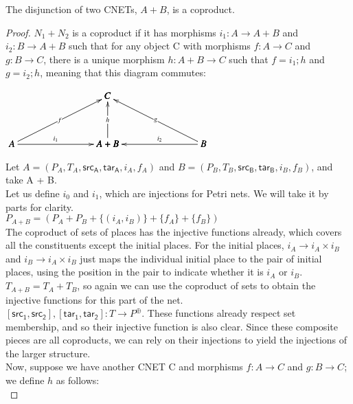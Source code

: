 \begin{lemma}
  \label{lemma:OR-coproduct}
  The disjunction of two CNETs, $A + B$, is a coproduct. 
\end{lemma}
\begin {proof}
$N_1 + N_2$ is a coproduct if it has morphisms $i_1: A \to A + B$ and $i_2: B \to A + B$ such that for any object C with morphisms $f: A\to C$ and $g: B\to C$, there is a unique morphism $h: A + B \to C$ such that $f = i_1;h$ and $g = i_2; h$, meaning that this diagram commutes:\\
\begin{center}
  \begin{math}
    \bfig
    \Atrianglepair|mmmaa|/<-`<-`<-`->`<-/<1000,500>[
      C`
      A`
      A+B`
      B;
      f`
      h`
      g`
      i_1`
      i_2]
    \efig
  \end{math}
\end{center}
Let $A = (P_A, T_A, \mathsf{src_A}, \mathsf{tar_A}, i_A, f_A)$ and $B = (P_B, T_B, \mathsf{src_B}, \mathsf{tar_B}, i_B, f_B)$, and take A + B.\\
Let us define $i_0$ and $i_1$, which are injections for Petri nets. We will take it by parts for clarity.\\
$P_{A+B} = (P_A +P_B+\{(i_A, i_B)\} +\{f_A\} + \{f_B\})$\\
The coproduct of sets of places has the injective functions already, which covers all the constituents except the initial places. For the initial places, $i_A \to i_A \times i_B$ and $i_B \to i_A \times i_B$ just maps the individual initial place to the pair of initial places, using the position in the pair to indicate whether it is $i_A$ or $i_B$.\\
$T_{A+B} = T_A + T_B$, so again we can use the coproduct of sets to obtain the injective functions for this part of the net.\\ 
$[\mathsf{src_1}, \mathsf{src_2}], [\mathsf{tar_1}, \mathsf{tar_2}]: T\to P^\oplus$. These functions already respect set membership, and so their injective function is also clear. Since these composite pieces are all coproducts, we can rely on their injections to yield the injections of the larger structure.\smallskip\\ 
Now, suppose we have another CNET C and morphisms $f: A\to C$ and $g: B\to C$; we define $h$ as follows:\\

\end{proof}
